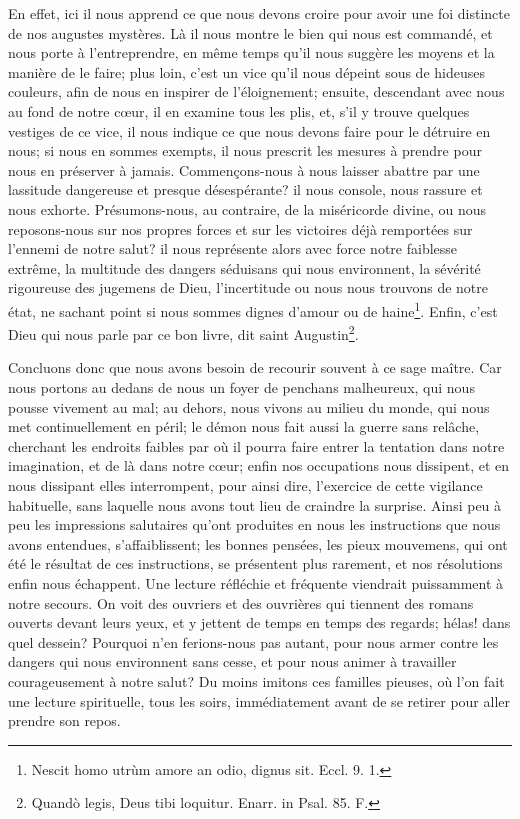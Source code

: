 \documentclass[instructions.tex]{subfiles}
\begin{document}
En effet, ici il nous apprend ce que nous devons croire pour avoir une foi distincte de nos augustes mystères. Là il nous montre le bien qui nous est commandé, et nous porte à l'entreprendre, en même temps qu'il nous suggère les moyens et la manière de le faire; plus loin, c'est un vice qu'il nous dépeint sous de hideuses couleurs, afin de nous en inspirer de l'éloignement; ensuite, descendant avec nous au fond de notre cœur, il en examine tous les plis, et, s'il y trouve quelques vestiges de ce vice, il nous indique ce que nous devons faire pour le détruire en nous; si nous en sommes exempts, il nous prescrit les mesures à prendre pour nous en préserver à jamais. Commençons-nous à nous laisser abattre par une lassitude dangereuse et presque désespérante? il nous console, nous rassure et nous exhorte. Présumons-nous, au contraire, de la miséricorde divine, ou nous reposons-nous sur nos propres forces et sur les victoires déjà remportées sur l'ennemi de notre salut? il nous représente alors avec force notre faiblesse extrême, la multitude des dangers séduisans qui nous environnent, la sévérité rigoureuse des jugemens de Dieu, l'incertitude ou nous nous trouvons de notre état, ne sachant point si nous sommes dignes d'amour ou de haine\footnote{Nescit homo utrùm amore an odio, dignus sit. Eccl. 9. 1.}. Enfin, c'est Dieu qui nous parle par ce bon livre, dit saint Augustin\footnote{Quandò legis, Deus tibi loquitur. Enarr. in Psal. 85. F.}.
 
Concluons donc que nous avons besoin de recourir souvent à ce sage maître. Car nous portons au dedans de nous un foyer de penchans malheureux, qui nous pousse vivement au mal; au dehors, nous vivons au milieu du monde, qui nous met continuellement en péril; le démon nous fait aussi la guerre sans relâche, cherchant les endroits faibles par où il pourra faire entrer la tentation dans notre imagination, et de là dans notre cœur; enfin nos occupations nous dissipent, et en nous dissipant elles interrompent, pour ainsi dire, l'exercice de cette vigilance habituelle, sans laquelle nous avons tout lieu de craindre la surprise. Ainsi peu à peu les impressions salutaires qu'ont produites en nous les instructions que nous avons entendues, s'affaiblissent; les bonnes pensées, les pieux mouvemens, qui ont été le résultat de ces instructions, se présentent plus rarement, et nos résolutions enfin nous échappent. Une lecture réfléchie et fréquente viendrait puissamment à notre secours. On voit des ouvriers et des ouvrières qui tiennent des romans ouverts devant leurs yeux, et y jettent de temps en temps des regards; hélas! dans quel dessein? Pourquoi n'en ferions-nous pas autant, pour nous armer contre les dangers qui nous environnent sans cesse, et pour nous animer à travailler courageusement à notre salut? Du moins imitons ces familles pieuses, où l'on fait une lecture spirituelle, tous les soirs, immédiatement avant de se retirer pour aller prendre son repos.
 
\end{document}

